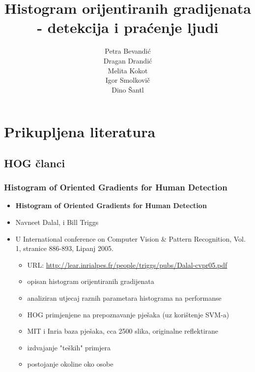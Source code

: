 \documentclass[times, utf8, seminar, numeric]{fer}
\begin{document}
\title{Histogram orijentiranih gradijenata - detekcija i praćenje ljudi}

\author{Petra Bevandić \\ Dragan Drandić \\ Melita Kokot \\ Igor Smolkovič \\ Dino Šantl}

\maketitle

\tableofcontents

\chapter{Prikupljena literatura}

\section{HOG članci}

\subsection{Histogram of Oriented Gradients for Human Detection}

\begin{itemize}

\item \textbf{Histogram of Oriented Gradients for Human Detection} 
\item Navneet Dalal, i Bill Triggs
\item U International conference on Computer Vision \& Pattern Recognition, Vol. 1, stranice 886-893, Lipanj 2005.
	\begin{itemize} 
		\item URL: \url{http://lear.inrialpes.fr/people/triggs/pubs/Dalal-cvpr05.pdf}
		\item opisan histogram orijentiranih gradijenata
		\item analiziran utjecaj raznih parametara histograma na performanse
		\item HOG primjenjene na prepoznavanje pješaka (uz korištenje SVM-a)
		\item MIT i Inria baza pješaka, cca 2500 slika, originalne reflektirane
		\item izdvajanje "teških" primjera
		\item postojanje okoline oko osobe
	\end{itemize}
\end{itemize}
\end{document}
